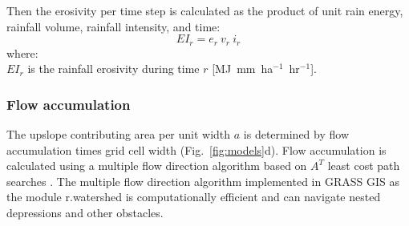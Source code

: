 \documentclass[gmd, manuscript]{copernicus}
\begin{document}

\noindent
Then the erosivity per time step %
is calculated as the product of 
unit rain energy, rainfall volume, rainfall intensity, and time:  
%
\begin{equation}
\label{eq:erosivity_index}
EI_{r} = e_r ~ v_r ~ i_{r}
\end{equation}
%
{\small
\noindent
where: \\
\hspace*{0.5em} $EI_r$ is the rainfall erosivity during time $r$ [\unit{MJ~mm~ha}$^{-1}$~\unit{hr}$^{-1}$].
}



\subsubsection{Flow accumulation}
%
The upslope contributing area per unit width $a$
is determined by flow accumulation times grid cell width
(Fig.~\ref{fig:models}d). 
Flow accumulation is calculated using 
a multiple flow direction algorithm \citep{Metz2009} 
based on $A^{T}$ least cost path searches \citep{Ehlschlaeger1989}. 
The multiple flow direction algorithm 
implemented in GRASS GIS as the module r.watershed
is computationally efficient and can
navigate nested depressions and other obstacles. 

\end{document}
